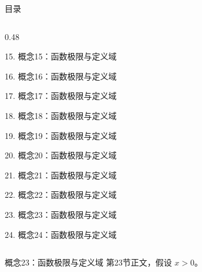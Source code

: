 \documentclass[aspectratio=169,10pt,fontset=fandol]{ctexbeamer}
\begin{document}
\begin{frame}[t,fragile]{目录}
\begin{columns}[T,onlytextwidth]
\begin{column}{0.48\textwidth}
{\color{black}\small 15. 概念15：函数极限与定义域\par}\vspace{0.22em}
{\color{black}\small 16. 概念16：函数极限与定义域\par}\vspace{0.22em}
{\color{black}\small 17. 概念17：函数极限与定义域\par}\vspace{0.22em}
{\color{black}\small 18. 概念18：函数极限与定义域\par}\vspace{0.22em}
{\color{black}\small 19. 概念19：函数极限与定义域\par}\vspace{0.22em}
{\color{black}\small 20. 概念20：函数极限与定义域\par}\vspace{0.22em}
{\color{black}\small 21. 概念21：函数极限与定义域\par}\vspace{0.22em}
{\color{black}\small 22. 概念22：函数极限与定义域\par}\vspace{0.22em}
{\color{blue}\small 23. 概念23：函数极限与定义域\par}\vspace{0.22em}
{\color{gray!40}\small 24. 概念24：函数极限与定义域\par}\vspace{0.22em}
\end{column}
\end{columns}
\end{frame}
\begin{frame}[t,fragile]{概念23：函数极限与定义域}
\normalsize
{\normalsize
第23节正文，假设 $x>0$。
}
\end{frame}
\end{document}
